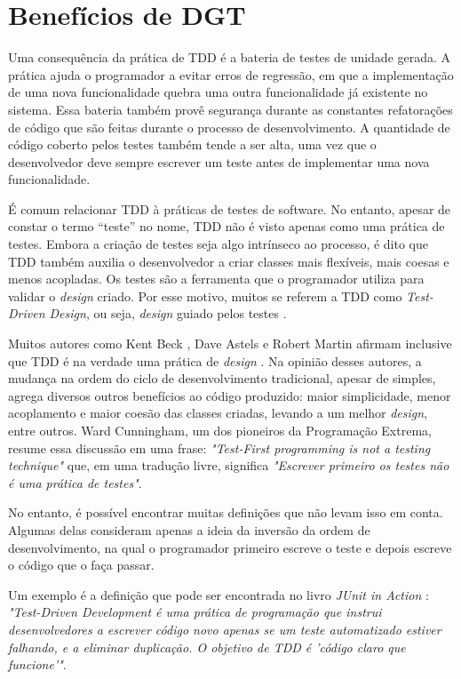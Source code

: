 \section{Benefícios de DGT}

Uma consequência da prática de TDD é a bateria de testes de unidade gerada.
A prática ajuda o programador a evitar erros de regressão, em que a implementação de
uma nova funcionalidade quebra uma outra funcionalidade já existente no sistema.
Essa bateria também provê segurança durante as
constantes refatorações de código que são feitas durante o processo de
desenvolvimento.
A quantidade de código coberto pelos testes também tende a ser alta, uma vez que o
desenvolvedor deve sempre escrever um teste antes de implementar uma nova
funcionalidade. 

É comum relacionar TDD à práticas de testes de software. No entanto, apesar de constar o
termo ``teste'' no nome, TDD não é visto apenas como uma prática de testes.
Embora a criação de testes seja algo intrínseco ao processo, é dito que TDD também 
auxilia o desenvolvedor a criar classes mais flexíveis, mais coesas e
menos acopladas. Os testes são a ferramenta que o programador utiliza para
validar o \textit{design} criado. Por esse motivo, muitos se referem a TDD como
\textit{Test-Driven Design}, ou seja, \textit{design} guiado pelos testes
\cite{tdd-taxonomy}.

Muitos autores como Kent Beck \cite{aim-fire}, Dave Astels \cite{astels-tdd} e
Robert Martin \cite{bob-martin} afirmam inclusive que TDD é na verdade uma prática de
\textit{design} \cite{tdd-taxonomy} \cite{aim-fire}.
Na opinião desses autores, a mudança na ordem do ciclo de
desenvolvimento tradicional, apesar de simples, agrega diversos outros
benefícios ao código produzido: maior simplicidade, menor acoplamento e maior
coesão das classes criadas, levando a um melhor \textit{design}, entre
outros. Ward Cunningham, um dos pioneiros da Programação Extrema, resume essa 
discussão em uma frase: \textit{"Test-First programming is not a testing technique"} 
que, em uma tradução livre, significa \textit{"Escrever primeiro os testes
não é uma prática de testes"}.

No entanto, é possível encontrar muitas definições que
não levam isso em conta. Algumas delas consideram apenas a ideia da
inversão da ordem de desenvolvimento, na qual o programador primeiro
escreve o teste e depois escreve o código que o faça passar.

Um exemplo é a definição que pode ser encontrada no livro \textit{JUnit
in Action} \cite{junit-in-action}: \textit{"Test-Driven Development é uma
prática de programação que instrui desenvolvedores a escrever código novo
apenas se um teste automatizado estiver falhando, e a eliminar duplicação. O
objetivo de TDD é 'código claro que funcione'"}.

